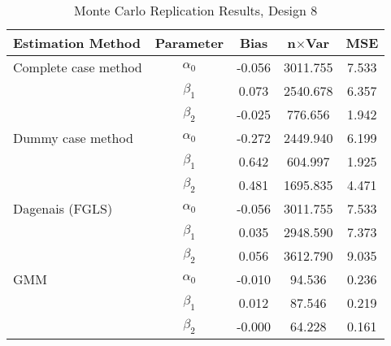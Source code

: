 \begin{table}
\centering
\caption{Monte Carlo Replication Results, Design 8}
\label{table:MCReplicationResultsDesign8}
\begin{tabular}{lcccc}
\toprule
Estimation Method & Parameter & Bias & n$\times$Var & MSE \\
\midrule
Complete case method & $\alpha_0$ & -0.056 & 3011.755 & 7.533 \\
 & $\beta_1$ & 0.073 & 2540.678 & 6.357 \\
 & $\beta_2$ & -0.025 & 776.656 & 1.942 \\
Dummy case method & $\alpha_0$ & -0.272 & 2449.940 & 6.199 \\
 & $\beta_1$ & 0.642 & 604.997 & 1.925 \\
 & $\beta_2$ & 0.481 & 1695.835 & 4.471 \\
Dagenais (FGLS) & $\alpha_0$ & -0.056 & 3011.755 & 7.533 \\
 & $\beta_1$ & 0.035 & 2948.590 & 7.373 \\
 & $\beta_2$ & 0.056 & 3612.790 & 9.035 \\
GMM & $\alpha_0$ & -0.010 & 94.536 & 0.236 \\
 & $\beta_1$ & 0.012 & 87.546 & 0.219 \\
 & $\beta_2$ & -0.000 & 64.228 & 0.161 \\
\bottomrule
\end{tabular}
\end{table}
